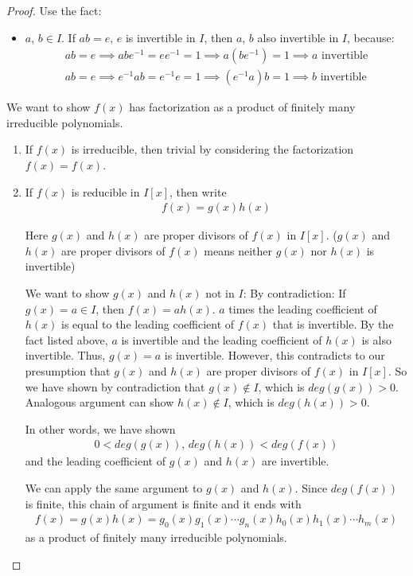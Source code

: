 \documentclass[utf8]{ctexbook}
\begin{document}
\begin{proof}
Use the fact:
\begin{itemize}
\item{$a$, $b \in I$. If $ab = e$, $e$ is invertible in $I$, then $a$, $b$ also invertible in $I$, because:
\begin{align*}
ab = e \implies ab e^{-1} = e e^{-1} = 1 \implies a(be^{-1}) = 1 \implies a \mbox{ invertible} \\
ab = e \implies e^{-1} ab = e^{-1} e = 1 \implies (e^{-1} a) b = 1 \implies b \mbox{ invertible}
\end{align*}
}
\end{itemize}

We want to show $f(x)$ has factorization as a product of finitely many irreducible polynomials.
\begin{enumerate}
\item{If $f(x)$ is irreducible, then trivial by considering the factorization $f(x) = f(x)$.}
\item{If $f(x)$ is reducible in $I[x]$, then write
\begin{align*}
f(x) = g(x) h(x)
\end{align*}

Here $g(x)$ and $h(x)$ are proper divisors of $f(x)$ in $I[x]$. ($g(x)$ and $h(x)$ are proper divisors of $f(x)$ means neither $g(x)$ nor $h(x)$ is invertible)

We want to show $g(x)$ and $h(x)$ not in $I$: By contradiction: If $g(x) = a \in I$, then $f(x) = a h(x)$. $a$ times the leading coefficient of $h(x)$ is equal to the leading coefficient of $f(x)$ that is invertible. By the fact listed above, $a$ is invertible and the leading coefficient of $h(x)$ is also invertible. Thus, $g(x) =a$ is invertible. However, this contradicts to our presumption that $g(x)$ and $h(x)$ are proper divisors of $f(x)$ in $I[x]$. So we have shown by contradiction that $g(x) \not \in I$, which is $deg(g(x)) > 0$. Analogous argument can show $h(x) \not \in I$, which is $deg(h(x)) > 0$.

In other words, we have shown
\begin{align*}
0 < deg(g(x)), \, deg(h(x)) < deg(f(x))
\end{align*}
and the leading coefficient of $g(x)$ and $h(x)$ are invertible.

We can apply the same argument to $g(x)$ and $h(x)$. Since $deg(f(x))$ is finite, this chain of argument is finite and it ends with
\begin{align*}
f(x) = g(x) h(x) = g_0 (x) g_1 (x) \cdots g_n (x) h_0 (x) h_1 (x) \cdots h_m (x)
\end{align*}
as a product of finitely many irreducible polynomials.
}
\end{enumerate}

\end{proof}
\end{document}
